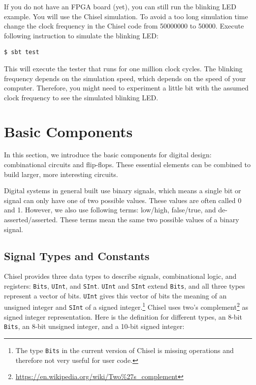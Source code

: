 \documentclass[%
    10pt,
    headinclude, footexclude,
    openright, %
    notitlepage,
    cleardoubleempty,
    headsepline,
    pointlessnumbers,
    bibtotoc, idxtotoc,
    ]{scrbook}
\newcommand{\code}[1]{{\small{\texttt{#1}}}}
\newcommand{\codefoot}[1]{{\footnotesize{\texttt{#1}}}}
\newcommand{\myref}[2]{\href{#1}{#2}}
\renewcommand{\myref}[2]{{#2}{\footnote{\url{#1}}}}
\begin{document}
If you do not have an FPGA board (yet), you can still run the blinking LED example.
You will use  the Chisel simulation. To avoid a too long simulation time change the
clock frequency in the Chisel code from 50000000 to 50000. Execute following
instruction to simulate the blinking LED:

\begin{verbatim}
$ sbt test
\end{verbatim}

This will execute the tester that runs for one million clock cycles.
The blinking frequency depends on the simulation speed, which depends on the
speed of your computer. Therefore, you might need to experiment a little bit
with the assumed clock frequency to see the simulated blinking LED.

\chapter{Basic Components}

In this section, we introduce the basic components for digital design:
combinational circuits and flip-flops.
These essential elements can be combined to build larger, more interesting circuits.

Digital systems in general built use binary signals, which means a single bit or signal
can only have one of two possible values. These values are often called 0 and 1. However, we
also use following terms: low/high, false/true, and de-asserted/asserted.
These terms mean the same two possible values of a binary signal.

\section{Signal Types and Constants}

Chisel provides three data types to describe signals, combinational logic, and registers:
\code{Bits}, \code{UInt}, and \code{SInt}. \code{UInt} and \code{SInt} extend \code{Bits},
and all three types represent a vector of bits. \code{UInt} gives this vector of
bits the meaning of an unsigned integer and \code{SInt} of a signed
integer.\footnote{The type \codefoot{Bits} in the current version of Chisel is missing operations and
therefore not very useful for user code.}
Chisel uses \myref{https://en.wikipedia.org/wiki/Two\%27s\_complement}{two's complement}
as signed integer representation.
Here is the definition for different types, an 8-bit \code{Bits}, an 8-bit unsigned integer, and a 10-bit
signed integer:
\end{document}

